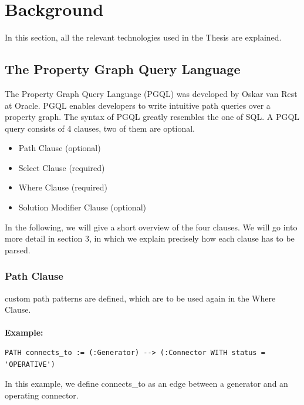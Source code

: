 \documentclass[11pt,singlecolumn]{scrartcl}
\begin{document}

\section{Background}
In this section, all the relevant technologies used in the Thesis are explained.
\subsection{The Property Graph Query Language}

The Property Graph Query Language (PGQL) was developed by Oskar van Rest at Oracle\cite{vanRest:2016}. PGQL enables developers to write intuitive path queries over a property graph. The syntax of PGQL greatly resembles the one of SQL. A PGQL query consists of 4 clauses, two of them are optional.
\begin{itemize} 
\item Path Clause (optional)
\item Select Clause (required)
\item Where Clause (required)
\item Solution Modifier Clause (optional)
\end{itemize}
In the following, we will give a short overview of the four clauses. We will go into more detail in section 3, in which we explain precisely how each clause has to be parsed.

\subsubsection{Path Clause} custom path patterns are defined, which are to be used again in the Where Clause.\\\\
\textbf{Example:}
\begin{verbatim}
PATH connects_to := (:Generator) --> (:Connector WITH status = 'OPERATIVE')
 \end{verbatim}
\noindent In this example, we define connects\_to as an edge between a generator and an operating connector.
\end{document}

